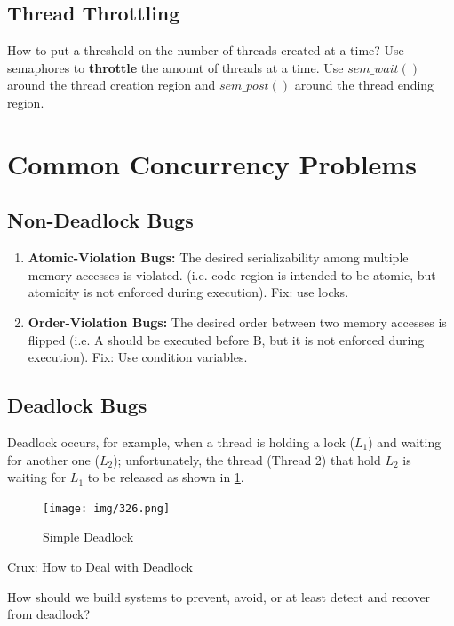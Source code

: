\subsection{Thread Throttling}

How to put a threshold on the number of threads created at a time? Use semaphores
to \textbf{throttle} the amount of threads at a time. Use $sem\_wait()$ around 
the thread creation region and $sem\_post()$ around the thread ending region.

\section{Common Concurrency Problems}

\subsection{Non-Deadlock Bugs}

\begin{enumerate}
    \item \textbf{Atomic-Violation Bugs:} The desired serializability among
        multiple memory accesses is violated. (i.e. code region is intended
        to be atomic, but atomicity is not enforced during execution). Fix:
        use locks.

    \item \textbf{Order-Violation Bugs:} The desired order between two memory
        accesses is flipped (i.e. A should be executed before B, but it is not
        enforced during execution). Fix: Use condition variables.
\end{enumerate}

\subsection{Deadlock Bugs}

Deadlock occurs, for example, when a thread is holding a lock ($L_1$) and 
waiting for another one ($L_2$); unfortunately, the thread (Thread 2) that
hold $L_2$ is waiting for $L_1$ to be released as shown in \ref{326}.

\begin{figure}[h!]
    \label{326}
    \begin{center}
        \texttt{[image: img/326.png]}
        \caption{Simple Deadlock}
    \end{center}
\end{figure}

\begin{tcolorbox}
    \begin{center}
        Crux: How to Deal with Deadlock
    \end{center}

    How should we build systems to prevent, avoid, or at least detect and
    recover from deadlock?
\end{tcolorbox}

